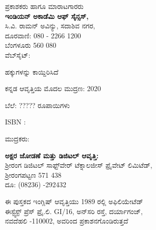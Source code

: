 

\begin{flushleft}
ಪ್ರಕಾಶಕರು ಹಾಗೂ ಮಾರಾಟಗಾರರು  \\
\textbf{ಇಂಡಿಯನ್ ಅಕಾಡೆಮಿ ಆಫ್  ಸೈನ್ಸಸ್,}\\
 ಸಿ.ವಿ. ರಾಮನ್ ಅವಿನ್ಯು, ಸದಾಶಿವ ನಗರ,\\
 ದೂರವಾಣಿ: 080 - 2266 1200\\
 ಬೆಂಗಳೂರು 560 080\\
 ವೆಬ್‍ಸೈಟ್: 
\end{flushleft}

\vfill

\noindent {}

\noindent ಹಕ್ಕುಗಳನ್ನು ಕಾಯ್ದಿರಿಸಿದೆ 

\medskip

\noindent ಕನ್ನಡ ಆವೃತ್ತಿಯ ಮೊದಲ ಮುದ್ರಣ:  2020

\noindent ಬೆಲೆ: ????? ರೂಪಾಯಿಗಳು 

\noindent ISBN : 

\noindent ಮುದ್ರಕರು: 


\vfill

\begin{flushleft}
 \textbf{ಅಕ್ಷರ ಜೋಡಣೆ ಮತ್ತು ಡಿಜಿಟಲ್ ಆವೃತ್ತಿ:}\\
 ಶ‍್ರೀರಂಗ ಡಿಜಿಟಲ್ ಸಾಫ್ಟ್‌ವೇರ್ ಟೆಕ್ನಾಲಜೀಸ್ ಪ್ರೈವೇಟ್ ಲಿಮಿಟೆಡ್,\\
 ಶ‍್ರೀರಂಗಪಟ್ಟಣ 571 438\\ 
 ದೂ: (08236) -292432
\end{flushleft}


\noindent
\begin{center}
ಈ ಪುಸ್ತಕದ ಇಂಗ್ಲಿಷ್ ಆವೃತ್ತಿಯು 1989 ರಲ್ಲಿ ಅಫಿಲಿಯೇಟೆಡ್ \\
 ಈಸ್ಟ್\enginline{-}ವೆಸ್ಟ್ ಪ್ರೆಸ್ ಪ್ರೈ.ಲಿ.  G\enginline{-}I/16, ಅನ್‌ಸರಿ ರಸ್ತೆ, ದರ್ಯಾಗಂಜ್,\\
   ನವದೆಹಲಿ -110002,  ಅವರಿಂದ ಪ್ರಕಾಶನಗೊಂಡಿರುತ್ತದೆ 
\end{center}
